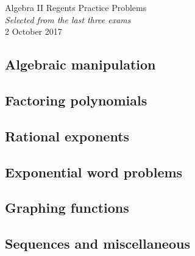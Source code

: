 \documentclass[]{book}
\begin{document}
\begin{center}
{\Large Algebra II Regents Practice Problems}\\
\textit{Selected from the last three exams}\\ %
2 October 2017%
\end{center}

\vspace{0.2 cm}


\begin{enumerate}

\subsection*{Algebraic manipulation}


\subsection*{Factoring polynomials}


\subsection*{Rational exponents}


\newpage
\subsection*{Exponential word problems}


\newpage %
\subsection*{Graphing functions}


\subsection*{Sequences and miscellaneous}

	

\end{enumerate}
\end{document}
